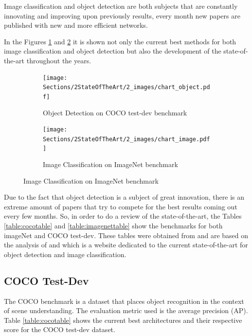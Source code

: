 \par Image classification and object detection are both subjects that are constantly innovating and improving upon previously results, every month new papers are published with new and more efficient networks. 
\par In the Figures \ref{fig:leaderboard_object} and \ref{fig:leaderboard_image} it is shown  not only the current best methods for both image classification and object detection but also the development of the state-of-the-art throughout the years.


\begin{figure}[H]
    \centering
    \captionsetup{justification=centering}
    \begin{subfigure}{0.49\textwidth}
        \texttt{[image: Sections/2StateOfTheArt/2\_images/chart\_object.pdf]}
        \caption{Object Detection on COCO test-dev benchmark \cite{papers_object}}
        \label{fig:leaderboard_object}
        \end{subfigure}
        \begin{subfigure}{0.49\textwidth}
        \texttt{[image: Sections/2StateOfTheArt/2\_images/chart\_image.pdf]}
        \caption{Image Classification on ImageNet benchmark \cite{papers_image}}
        \label{fig:leaderboard_image}
        \end{subfigure}
    \label{fig:example_f1}
\end{figure}




\par Due to the fact that object detection is a subject of great innovation, there is an extreme amount of papers that try to compete for the best results coming out every few months. So, in order to do a review of the state-of-the-art, the Tables \ref{table:cocotable} and \ref{table:imagenettable} show the benchmarks for both imageNet and COCO test-dev. These tables were obtained from \cite{Ribeiro} and are based on the analysis of \cite{papers_image} and \cite{papers_object} which is a website dedicated to  the current state-of-the-art for object detection and image classification.






\subsection{COCO Test-Dev}

\par The COCO benchmark \cite{Lin2014} is a dataset that places object recognition in the context of scene understanding. The evaluation metric used is the average precision (AP). Table \ref{table:cocotable} shows the current best architectures and their respective score for the COCO test-dev dataset.

